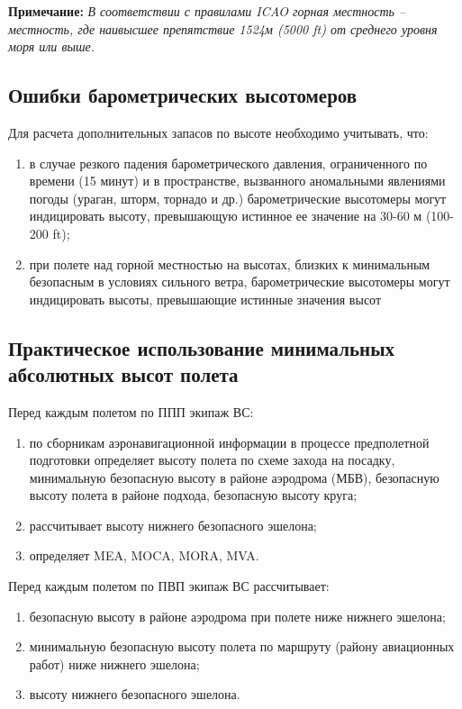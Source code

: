 \begin{appendix}
\textbf{Примечание:}
\textit{В соответствии с правилами ICAO горная местность – местность, где наивысшее препятствие 1524м (5000 ft) от среднего уровня моря или выше. }


    
\subsection{Ошибки барометрических высотомеров}
\setcounter{subsect}{0}

 Для расчета дополнительных запасов по высоте необходимо учитывать, что:
\begin{enumerate}[label=\alph*), ref=\alph*]
    \item в случае резкого падения барометрического давления, ограниченного по времени (15 минут) и в пространстве, вызванного аномальными явлениями погоды (ураган, шторм, торнадо и др.) барометрические высотомеры могут индицировать высоту, превышающую истинное ее значение на 30-60 м (100-200 ft);
    \item при полете над горной местностью на высотах, близких к минимальным безопасным в условиях сильного ветра, барометрические высотомеры могут индицировать высоты, превышающие истинные значения высот
\end{enumerate}
   

    
\subsection{Практическое использование минимальных абсолютных высот полета}
\setcounter{subsect}{0}

 Перед каждым полетом по ППП экипаж ВС:
\begin{enumerate}[label=\alph*), ref=\alph*]
    \item по сборникам аэронавигационной информации в процессе предполетной подготовки определяет высоту полета по схеме захода на посадку, минимальную безопасную высоту в районе аэродрома (МБВ), безопасную высоту полета в районе подхода, безопасную высоту круга;
    \item рассчитывает высоту нижнего безопасного эшелона;
    \item определяет MEA, MOCA, MORA, MVA.
\end{enumerate}


Перед каждым полетом по ПВП экипаж ВС рассчитывает:
\begin{enumerate}[label=\alph*), ref=\alph*]
    \item безопасную высоту в районе аэродрома при полете ниже нижнего эшелона;
    \item минимальную безопасную высоту полета по маршруту (району авиационных работ) ниже нижнего эшелона;
    \item высоту нижнего безопасного эшелона.    
\end{enumerate}



\end{appendix}
